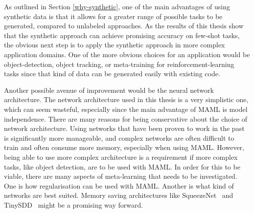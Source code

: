 As outlined in Section \ref{why-synthetic}, one of the main advantages of using synthetic data is that it allows for a greater range of possible tasks to be generated, compared to unlabeled approaches. As the results of this thesis show that the synthetic approach can achieve promising accuracy on few-shot tasks, the obvious next step is to apply the synthetic approach in more complex application domains. One of the more obvious choices for an application would be object-detection, object tracking, or meta-training for reinforcement-learning tasks since that kind of data can be generated easily with existing code.

Another possible avenue of improvement would be the neural network architecture. The network architecture used in this thesis is a very simplistic one, which can seem wasteful, especially since the main advantage of \gls{MAML} is model independence.  There are many reasons for being conservative about the choice of network architecture. Using networks that have been proven to work in the past is significantly more manageable, and complex networks are often difficult to train and often consume more memory, especially when using \gls{MAML}. However, being able to use more complex architecture is a requirement if more complex tasks, like object detection, are to be used with \gls{MAML}. In order for this to be viable, there are many aspects of meta-learning that needs to be investigated. One is how regularisation can be used with \gls{MAML}. Another is what kind of networks are best suited. Memory saving architectures like SqueezeNet~\cite{squeezenet} and TinySDD~\cite{tinyssd} might be a promising way forward.